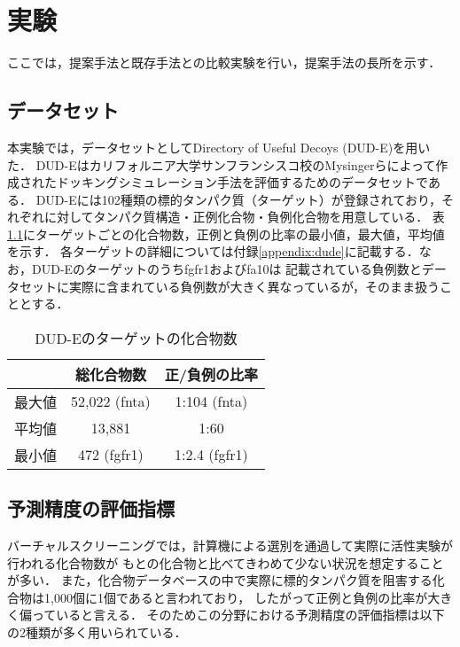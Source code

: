 \chapter{実験}
ここでは，提案手法と既存手法との比較実験を行い，提案手法の長所を示す．


\section{データセット}
本実験では，データセットとしてDirectory of Useful Decoys (DUD-E)\cite{Mysinger2012}を用いた．
DUD-Eはカリフォルニア大学サンフランシスコ校のMysingerらによって作成されたドッキングシミュレーション手法を評価するためのデータセットである．
DUD-Eには102種類の標的タンパク質（ターゲット）が登録されており，それぞれに対してタンパク質構造・正例化合物・負例化合物を用意している．
表\ref{table:dude}にターゲットごとの化合物数，正例と負例の比率の最小値，最大値，平均値を示す．
各ターゲットの詳細については付録\ref{appendix:dude}に記載する．なお，DUD-Eのターゲットのうちfgfr1およびfa10は
記載されている負例数とデータセットに実際に含まれている負例数が大きく異なっているが，そのまま扱うこととする．

\begin{table}[htb] \centering
	\caption{DUD-Eのターゲットの化合物数}
	\label {table:dude}
	\begin{tabular}{c|cc}
	\hline
			&総化合物数		&正/負例の比率	\\ \hline
	最大値	&52,022 (fnta)		&1:104 (fnta)		\\
	平均値	&13,881			&1:60			\\
	最小値	&472 (fgfr1)		&1:2.4 (fgfr1)		\\ \hline
	\end{tabular}
\end{table}

	
\section{予測精度の評価指標}
バーチャルスクリーニングでは，計算機による選別を通過して実際に活性実験が行われる化合物数が
もとの化合物と比べてきわめて少ない状況を想定することが多い．
また，化合物データベースの中で実際に標的タンパク質を阻害する化合物は1,000個に1個であると言われており，
したがって正例と負例の比率が大きく偏っていると言える．
そのためこの分野における予測精度の評価指標は以下の2種類が多く用いられている．

